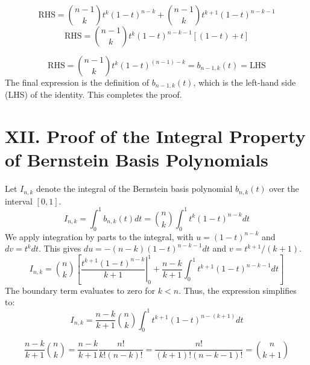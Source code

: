 \documentclass[a4paper]{article}
\begin{document}
\[
\text{RHS} = \binom{n-1}{k}t^k(1-t)^{n-k} + \binom{n-1}{k}t^{k+1}(1-t)^{n-k-1}
\]
\[
\text{RHS} = \binom{n-1}{k}t^k(1-t)^{n-k-1} \left[ (1-t) + t \right]
\]

\[
\text{RHS} = \binom{n-1}{k}t^k(1-t)^{(n-1)-k} = b_{n-1,k}(t) =\text{LHS}
\]
The final expression is the definition of $b_{n-1,k}(t)$, which is the left-hand side (LHS) of the identity. This completes the proof.


\section*{XII. Proof of the Integral Property of Bernstein Basis Polynomials}

Let $I_{n,k}$ denote the integral of the Bernstein basis polynomial $b_{n,k}(t)$ over the interval $[0,1]$.
\[
I_{n,k} = \int_0^1 b_{n,k}(t) dt = \binom{n}{k} \int_0^1 t^k (1-t)^{n-k} dt
\]
We apply integration by parts to the integral, with $u=(1-t)^{n-k}$ and $dv=t^k dt$. This gives $du=-(n-k)(1-t)^{n-k-1}dt$ and $v=t^{k+1}/(k+1)$.
\[
I_{n,k} = \binom{n}{k} \left[ \left. \frac{t^{k+1}(1-t)^{n-k}}{k+1} \right|_0^1 + \frac{n-k}{k+1} \int_0^1 t^{k+1} (1-t)^{n-k-1} dt \right]
\]
The boundary term evaluates to zero for $k < n$. Thus, the expression simplifies to:
\[
I_{n,k} = \frac{n-k}{k+1} \binom{n}{k} \int_0^1 t^{k+1} (1-t)^{n-(k+1)} dt
\]

\[
\frac{n-k}{k+1} \binom{n}{k} = \frac{n-k}{k+1} \frac{n!}{k!(n-k)!} = \frac{n!}{(k+1)!(n-k-1)!} = \binom{n}{k+1}
\]
\end{document}
